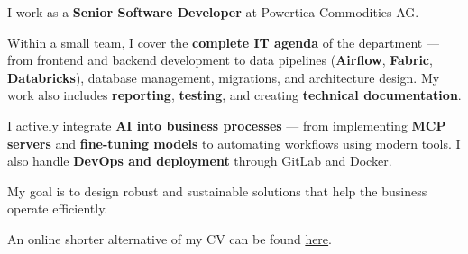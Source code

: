\documentclass[cv_en.tex]{subfiles}
\begin{document}

\newcommand\minitab[2][l]{\begin{tabular}[b]{#1}#2\end{tabular}}
\newcommand\tnode[2][left]{\tikz[baseline=(n.center)]\node(n)[inner sep=0,outer sep=0,align=#1]{#2};}
\newcommand*{\cventrylogo}[8][.25em]{
  \begin{tabular*}{\textwidth}{l@{\extracolsep{\fill}}r}%
    \tnode{\minitab[l]{
      {\bfseries #4} \\ {\itshape #3\ifthenelse{\equal{#7}{}}{}{, #7}}
    }}
    & 
    \tnode[right]{\minitab[r]{{\bfseries #6} \\ {\itshape #2} \\ #5}} 
      \\%
  \end{tabular*}%
  \ifx&#8&%
    \else{\\\vbox{\small#8}}\fi%
  \par\addvspace{#1}}


\vspace*{-8mm}

I work as a \textbf{Senior Software Developer} at Powertica Commodities AG. \\
\vspace*{-3mm}

Within a small team, I cover the \textbf{complete IT agenda} of the department — from frontend and backend development to data pipelines (\textbf{Airflow}, \textbf{Fabric}, \textbf{Databricks}), database management, migrations, and architecture design. My work also includes \textbf{reporting}, \textbf{testing}, and creating \textbf{technical documentation}. \\
\vspace*{-3mm}

I actively integrate \textbf{AI into business processes} — from implementing \textbf{MCP servers} and \textbf{fine-tuning models} to automating workflows using modern tools. I also handle \textbf{DevOps and deployment} through GitLab and Docker. \\
\vspace*{-3mm}

My goal is to design robust and sustainable solutions that help the business operate efficiently. \\
\vspace*{-3mm}

An online shorter alternative of my CV can be found 
\href{https://cv.dominik-97.cloud}{\color[RGB]{69,114,174}here}.
\end{document}
